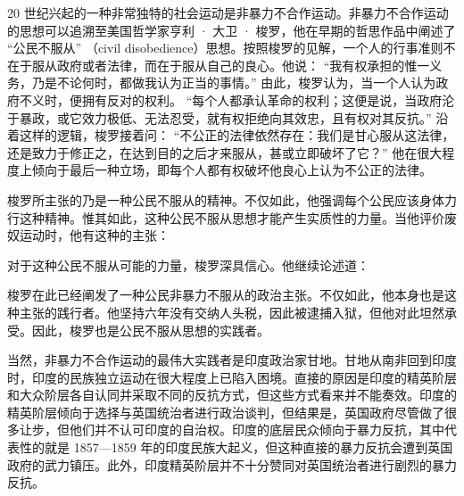 20 世纪兴起的一种非常独特的社会运动是非暴力不合作运动。非暴力不合作运动的思想可以追溯至美国哲学家亨利 · 大卫 · 梭罗，他在早期的哲思作品中阐述了 “公民不服从” （civil disobedience）思想。按照梭罗的见解，一个人的行事准则不在于服从政府或者法律，而在于服从自己的良心。他说： “我有权承担的惟一义务，乃是不论何时，都做我认为正当的事情。” 由此，梭罗认为，当一个人认为政府不义时，便拥有反对的权利。 “每个人都承认革命的权利；这便是说，当政府沦于暴政，或它效力极低、无法忍受，就有权拒绝向其效忠，且有权对其反抗。” 沿着这样的逻辑，梭罗接着问： “不公正的法律依然存在：我们是甘心服从这法律，还是致力于修正之，在达到目的之后才来服从，甚或立即破坏了它？” 他在很大程度上倾向于最后一种立场，即每个人都有权破坏他良心上认为不公正的法律。

梭罗所主张的乃是一种公民不服从的精神。不仅如此，他强调每个公民应该身体力行这种精神。惟其如此，这种公民不服从思想才能产生实质性的力量。当他评价废奴运动时，他有这种的主张：


对于这种公民不服从可能的力量，梭罗深具信心。他继续论述道：


梭罗在此已经阐发了一种公民非暴力不服从的政治主张。不仅如此，他本身也是这种主张的践行者。他坚持六年没有交纳人头税，因此被逮捕入狱，但他对此坦然承受。因此，梭罗也是公民不服从思想的实践者。

当然，非暴力不合作运动的最伟大实践者是印度政治家甘地。甘地从南非回到印度时，印度的民族独立运动在很大程度上已陷入困境。直接的原因是印度的精英阶层和大众阶层各自认同并采取不同的反抗方式，但这些方式看来并不能奏效。印度的精英阶层倾向于选择与英国统治者进行政治谈判，但结果是，英国政府尽管做了很多让步，但他们并不认可印度的自治权。印度的底层民众倾向于暴力反抗，其中代表性的就是 1857—1859 年的印度民族大起义，但这种直接的暴力反抗会遭到英国政府的武力镇压。此外，印度精英阶层并不十分赞同对英国统治者进行剧烈的暴力反抗。

